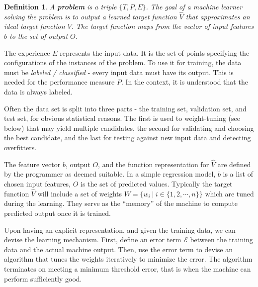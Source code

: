 \documentclass[12pt]{article}  %
\newtheorem{definition}{Definition}
\begin{document}
\begin{definition}
A {\bf \em problem} is a triple $\{T, P, E\}$. The goal of a machine learner solving the problem is to output a learned target function $\hat{V}$ that approximates an ideal target function $V$. The target function maps from the vector of input features $b$ to the set of output $O$.
\end{definition}


The experience $E$ represents the input data. It is the set of points specifying the configurations of the instances of the problem. To use it for training, the data must be {\em labeled / classified} - every input data must have its output. This is needed for the performance measure $P$. In the context, it is understood that the data is always labeled.

Often the data set is split into three parts - the training set, validation set, and test set, for obvious statistical reasons. The first is used to weight-tuning (see below) that may yield multiple candidates, the second for validating and choosing the best candidate, and the last for testing against new input data and detecting overfitters. 


The feature vector $b$, output $O$, and the function representation for $\hat{V}$ are defined by the programmer as deemed suitable. In a simple regression model, $b$ is a list of chosen input features, $O$ is the set of predicted values. Typically the target function $\hat{V}$ will include a set of weights $W = \{w_i \ | \ i \in \{1,2,\cdots,n\}\}$ which are tuned during the learning. They serve as the ``memory'' of the machine to compute predicted output once it is trained.



Upon having an explicit representation, and given the training data, we can devise the learning mechanism. First, define an error term $\mathcal{E}$ between the training data and the actual machine output. Then, use the error term to devise an algorithm that tunes the weights iteratively to minimize the error. The algorithm terminates on meeting a minimum threshold error, that is when the machine can perform sufficiently good.
\end{document}
